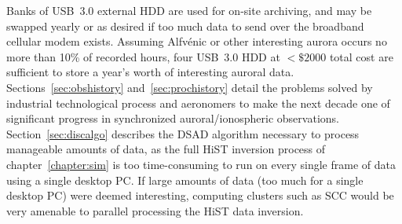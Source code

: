 Banks of USB~3.0 external HDD are used for on-site archiving, and may be swapped yearly or as desired if too much data to send over the broadband cellular modem exists.
Assuming Alfvénic or other interesting aurora occurs no more than 10\% of recorded hours, four USB~3.0 HDD at $< \$2000$ total cost are sufficient to store a year's worth of interesting auroral data.
Sections~\ref{sec:obshistory} and~\ref{sec:prochistory} detail the problems solved by industrial technological process and aeronomers to make the next decade one of significant progress in synchronized auroral/ionospheric observations.
Section~\ref{sec:discalgo} describes the DSAD algorithm necessary to process manageable amounts of data, as the full HiST inversion process of chapter~\ref{chapter:sim} is too time-consuming to run on every single frame of data using a single desktop PC. 
If large amounts of data (too much for a single desktop PC) were deemed interesting, computing clusters such as SCC would be very amenable to parallel processing the HiST data inversion.

